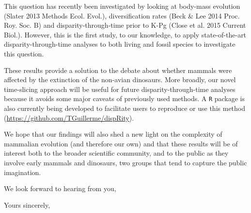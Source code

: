 \documentclass[11pt]{letter}
\begin{document}
\begin{letter}{}
This question has recently been investigated by looking at body-mass evolution (Slater 2013 Methods Ecol. Evol.), diversification rates (Beck \& Lee 2014 Proc. Roy. Soc. B) and disparity-through-time prior to K-Pg (Close et al. 2015 Current Biol.).
However, this is the first study, to our knowledge, to apply state-of-the-art disparity-through-time analyses to both living and fossil species to investigate this question.

These results provide a solution to the debate about whether mammals were affected by the extinction of the non-avian dinosaurs.
More broadly, our novel time-slicing approach will be useful for future disparity-through-time analyses because it avoids some major caveats of previously used methods.
A \texttt{R} package is also currently being developed to facilitate users to reproduce or use this method (\url{https://github.com/TGuillerme/dispRity}).

We hope that our findings will also shed a new light on the complexity of mammalian evolution (and therefore our own) and that these results will be of interest both to the broader scientific community, and to the public as they involve early mammals and dinosaurs, two groups that tend to capture the public imagination.



We look forward to hearing from you,

\closing{Yours sincerely,}





\end{letter}
\end{document}
